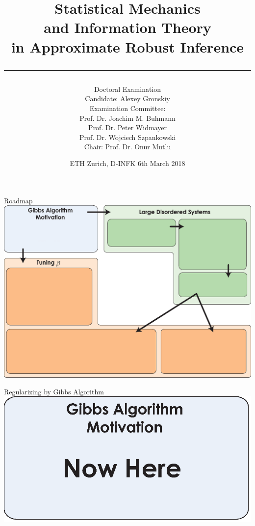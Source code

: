 \documentclass[presentation,12pt]{beamer}
\title{Statistical Mechanics \\ and Information Theory \\ in Approximate Robust Inference \\[10pt] \hrule}
\author[Alexey~Gronskiy]
{ %
\footnotesize%
Doctoral Examination \\
%
Candidate: Alexey Gronskiy\\[8pt]
%
Examination Committee: \\
Prof. Dr. Joachim M. Buhmann \\
Prof. Dr. Peter Widmayer \\
Prof. Dr. Wojciech Szpankowski \\[8pt]
%
Chair: Prof. Dr. Onur Mutlu \\[-.5cm]
}
\date[ETH Zurich, D-INFK, 6 Mar 2018]{{\scriptsize ETH Zurich, D-INFK \qquad 6th March 2018}}
\newcommand{\setroadmapfootline}{%
\setfootline{%
  \textcolor{gray!60}{%
    \tiny\insertshortdate \hfill \insertshortauthor \quad 
    \phantom{\insertframenumber/\inserttotalframenumber}
  }%
}%
}
\begin{document}
{
\begin{frame}[noframenumbering]
  \titlepage
\end{frame}
}

{\setroadmapfootline \begin{frame}[noframenumbering]{Roadmap}
\centering
\includegraphics[width=\textwidth]{roadmap_start} 
\end{frame}}

{\setroadmapfootline \begin{frame}[noframenumbering]{Regularizing by Gibbs Algorithm}
\centering
\includegraphics[width=\textwidth]{roadmap_after_start} 
\end{frame}}

\end{document}
